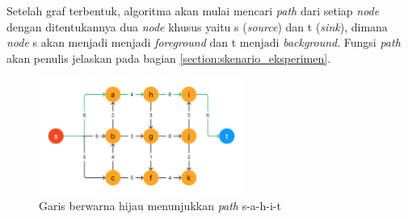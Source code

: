 

Setelah graf terbentuk, algoritma akan mulai mencari \emph{path} dari setiap \emph{node}
dengan ditentukannya dua \emph{node} khusus yaitu s (\emph{source}) dan t (\emph{sink}), 
dimana \emph{node} s akan menjadi  menjadi \emph{foreground} dan t menjadi \emph{background}.
Fungsi \emph{path} akan penulis jelaskan pada bagian \ref{section:skenario_eksperimen}.

\begin{figure}[H]
	\centering{}
	\includegraphics[width=0.6\textwidth]{gambar/contoh_path.png}
	\caption{Garis berwarna hijau menunjukkan \emph{path} s-a-h-i-t}
\end{figure}







